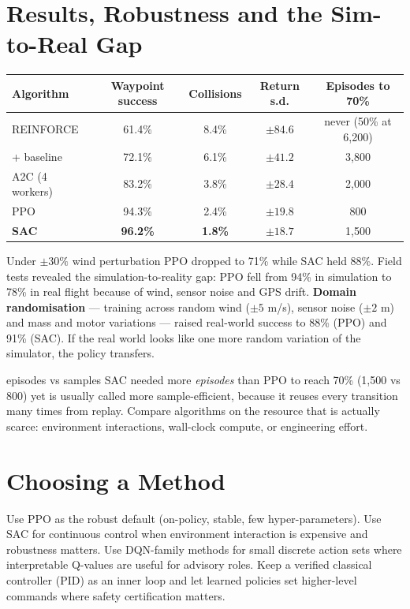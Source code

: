 \documentclass[11pt]{article}
\begin{document}
\section{Results, Robustness and the Sim-to-Real Gap}
\begin{center}\small\renewcommand{\arraystretch}{1.2}
\begin{tabular}{lcccc}\toprule Algorithm & Waypoint success & Collisions & Return s.d. & Episodes to 70\%\\\midrule REINFORCE & 61.4\% & 8.4\% & $\pm84.6$ & never (50\% at 6,200)\\ + baseline & 72.1\% & 6.1\% & $\pm41.2$ & 3,800\\ A2C (4 workers) & 83.2\% & 3.8\% & $\pm28.4$ & 2,000\\ PPO & 94.3\% & 2.4\% & $\pm19.8$ & 800\\ \textbf{SAC} & \textbf{96.2\%} & \textbf{1.8\%} & $\pm18.7$ & 1,500\\\bottomrule\end{tabular}\end{center}
Under $\pm30\%$ wind perturbation PPO dropped to 71\% while SAC held 88\%. Field tests revealed the simulation-to-reality gap: PPO fell from 94\% in simulation to 78\% in real flight because of wind, sensor noise and GPS drift. \textbf{Domain randomisation} --- training across random wind ($\pm5$ m/s), sensor noise ($\pm2$ m) and mass and motor variations --- raised real-world success to 88\% (PPO) and 91\% (SAC). If the real world looks like one more random variation of the simulator, the policy transfers.
\begin{pitfall}{episodes vs samples}
SAC needed more \emph{episodes} than PPO to reach 70\% (1,500 vs 800) yet is usually called more sample-efficient, because it reuses every transition many times from replay. Compare algorithms on the resource that is actually scarce: environment interactions, wall-clock compute, or engineering effort.
\end{pitfall}

\section{Choosing a Method}
Use PPO as the robust default (on-policy, stable, few hyper-parameters). Use SAC for continuous control when environment interaction is expensive and robustness matters. Use DQN-family methods for small discrete action sets where interpretable Q-values are useful for advisory roles. Keep a verified classical controller (PID) as an inner loop and let learned policies set higher-level commands where safety certification matters.
\end{document}
